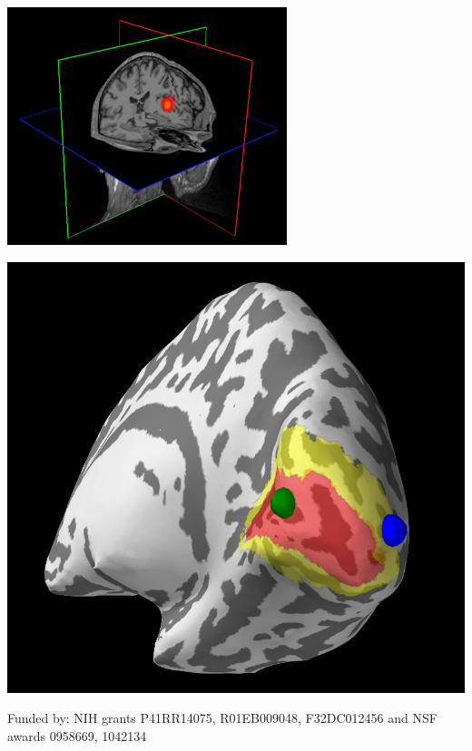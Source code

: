 \documentclass[t,11pt,compress]{beamer} %
\begin{document}
\begin{frame}[plain,t,c]
\begin{minipage}{1.09\linewidth}
\begin{minipage}{.23\linewidth}
\end{minipage}%
\hspace{1.5em}%
\begin{minipage}{.18\linewidth}
    \includegraphics[width=\linewidth]{volume_tc.png}%
\end{minipage}%
\hspace{1.5em}%
\begin{minipage}{.20\linewidth}
    \includegraphics[width=0.8\linewidth]{tf_mxne.png}%
\end{minipage}
\vspace{1em}%
\end{minipage}
\begin{minipage}{\linewidth}
    \vspace*{-0.5em}%
    \center
    Funded by: NIH grants P41RR14075, R01EB009048, F32DC012456 and NSF awards 0958669, 1042134
\end{minipage}
\smallskip
~
\end{frame}
\end{document}
